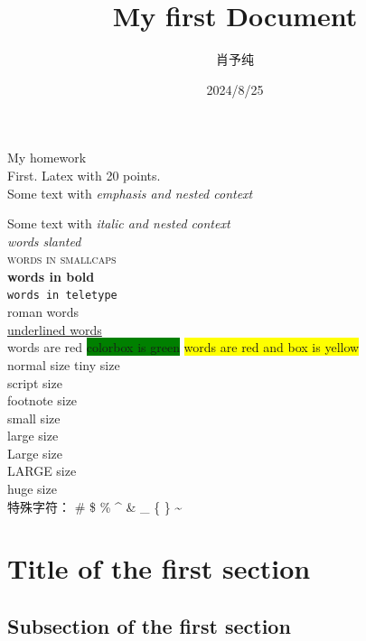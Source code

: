 \documentclass[a4paper, 12pt]{article}
\begin{document}
	\title{My first Document}
	\author{肖予纯}
	\date{2024/8/25}
	\maketitle
	\noindent	My homework \\First. Latex with 20 points. 
	\\%
	
	Some text with \emph{emphasis and \emph{nested} context}%
	
	Some text with \textit{italic and \textit{nested} context}%
	\\
	\textsl{words slanted}\\
	\textsc{words in smallcaps}\\
	\textbf{words in bold}\\
	\texttt{words in teletype}\\
	\textrm{roman words}\\
	\underline{underlined words}\\
	
	{\color{red}words are red}
	\colorbox{green}{colorbox is green}
	\colorbox{yellow}{{\color{red}words are red and box is yellow}}
	\\
	normal size
	{\tiny tiny size}\\
	{\scriptsize script size}\\
	{\footnotesize footnote size}\\
	{\small small size}\\
	{\large large size}\\
	{\Large Large size}\\
	{\LARGE LARGE size}\\
	{\huge huge size}\\
	特殊字符：
	\# \$ \% \^{} \& \_ \{ \} \~{}
	
	\section{Title of the first section}
	\subsection{Subsection of the first section}
\end{document}
